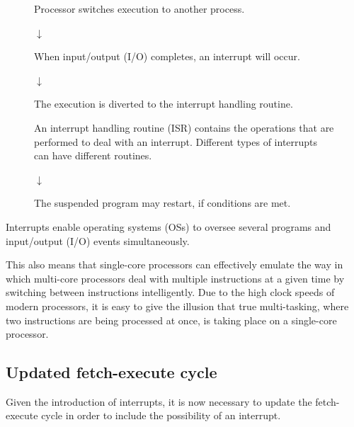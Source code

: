 \documentclass[a4paper]{systems-software}
\begin{document}
\begin{figure}[H]
{\begin{minipage}{\dimexpr \textwidth-2\fboxsep-2\fboxrule}
	Processor switches execution to another process.
	
	\begin{center}
		$\downarrow$
	\end{center}
	
	When input/output (I/O) completes, an interrupt will occur.
	
	\begin{center}
		$\downarrow$
	\end{center}
	
	The execution is diverted to the interrupt handling routine.
	
	An interrupt handling routine (ISR) contains the operations that are performed to deal with an interrupt. Different types of interrupts can have different routines.
	
	\begin{center}
		$\downarrow$
	\end{center}
	
	The suspended program may restart, if conditions are met.
	\end{minipage}}
\end{figure}

Interrupts enable operating systems (OSs) to oversee several programs and input/output (I/O) events simultaneously.

This also means that single-core processors can effectively emulate the way in which multi-core processors deal with multiple instructions at a given time by switching between instructions intelligently. Due to the high clock speeds of modern processors, it is easy to give the illusion that true multi-tasking, where two instructions are being processed at once, is taking place on a single-core processor.


\subsection*{Updated fetch-execute cycle}

Given the introduction of interrupts, it is now necessary to update the fetch-execute cycle in order to include the possibility of an interrupt.
\end{document}
